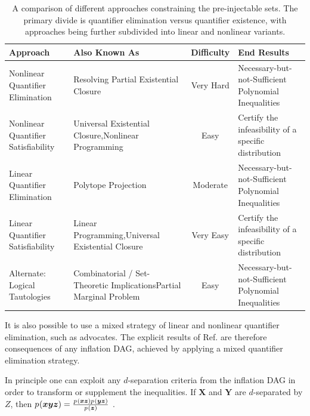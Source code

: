 {\begin{asparadesc}
\begin{table}[ht]\centering\caption{A comparison of different approaches constraining the pre-injectable sets. The primary divide is quantifier elimination versus quantifier existence, with approaches being further subdivided into linear and nonlinear variants.}
\begin{tabularx}{\linewidth}{ |l|L|c|L| } 
\hline
Approach & Also Known As & Difficulty & End Results \\
\bottomrule
Nonlinear Quantifier Elimination & Resolving Partial Existential Closure & Very Hard & Necessary-but-not-Sufficient Polynomial Inequalities \\
\hline
Nonlinear Quantifier Satisfiability & Universal Existential Closure,\newline Nonlinear Programming & Easy & Certify the infeasibility of a specific distribution \\
\hline
Linear Quantifier Elimination & Polytope Projection & Moderate & Necessary-but-not-Sufficient Polynomial Inequalities \\
\hline
Linear Quantifier Satisfiability & Linear Programming,\newline Universal Existential Closure & Very Easy & Certify the infeasibility of a specific distribution \\
\hline
Alternate: Logical Tautologies & Combinatorial / Set-Theoretic Implications\newline Partial Marginal Problem & Easy & Necessary-but-not-Sufficient Polynomial Inequalities 
\\\toprule
\end{tabularx}
\end{table}

It is also possible to use a mixed strategy of linear and nonlinear quantifier elimination, such as \citet{ChavesPolynomial} advocates. The explicit results of Ref. \cite{ChavesPolynomial} are therefore consequences of any inflation DAG, achieved by applying a mixed quantifier elimination strategy.

\medskip\item[\tred{Coinciding Marginal Distributions}] \noindent







In principle one can exploit any $d$-separation criteria from the inflation DAG in order to transform or supplement the inequalities. If $\bm{X}$ and $\bm{Y}$ are $d$-separated by $Z$, then ${p_{}}\lparen\bm{x} \bm{y} \bm{z}\rparen=\frac{{p_{}}\lparen\bm{x}\bm{z}\rparen{p_{}}\lparen\bm{y}\bm{z}\rparen}{{p_{}}\lparen\bm{z}\rparen}$ \cite{pearl2009causality,spirtes2011causation,studeny2005probabilistic,koller2009probabilistic}.



\end{asparadesc}}
